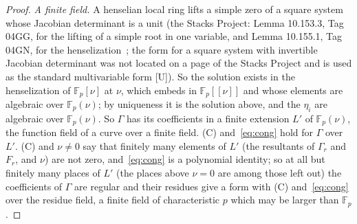 \documentclass[11pt]{article}
\theoremstyle{definition}
\theoremstyle{remark}
\newcommand{\F}{\mathbb{F}}
\begin{document}
\begin{proof}
\emph{A finite field.} A henselian local ring lifts a simple zero of a square system whose Jacobian determinant is a unit (the Stacks Project: Lemma 10.153.3, Tag 04GG, for the lifting of a simple root in one variable, and Lemma 10.155.1, Tag 04GN, for the henselization~\cite{StacksMore}; the form for a square system with invertible Jacobian determinant was not located on a page of the Stacks Project and is used as the standard multivariable form [U]). So the solution exists in the henselization of $\F_p[\nu]$ at $\nu$, which embeds in $\F_p[[\nu]]$ and whose elements are algebraic over $\F_p(\nu)$; by uniqueness it is the solution above, and the $\eta_i$ are algebraic over $\F_p(\nu)$. So $\Gamma$ has its coefficients in a finite extension $L'$ of $\F_p(\nu)$, the function field of a curve over a finite field. (C) and~\eqref{eq:cong} hold for $\Gamma$ over $L'$. (C) and $\nu\ne0$ say that finitely many elements of $L'$ (the resultants of $\Gamma_r$ and $F_r$, and $\nu$) are not zero, and~\eqref{eq:cong} is a polynomial identity; so at all but finitely many places of $L'$ (the places above $\nu=0$ are among those left out) the coefficients of $\Gamma$ are regular and their residues give a form with (C) and~\eqref{eq:cong} over the residue field, a finite field of characteristic $p$ which may be larger than $\F_p$.
\end{proof}
\end{document}
